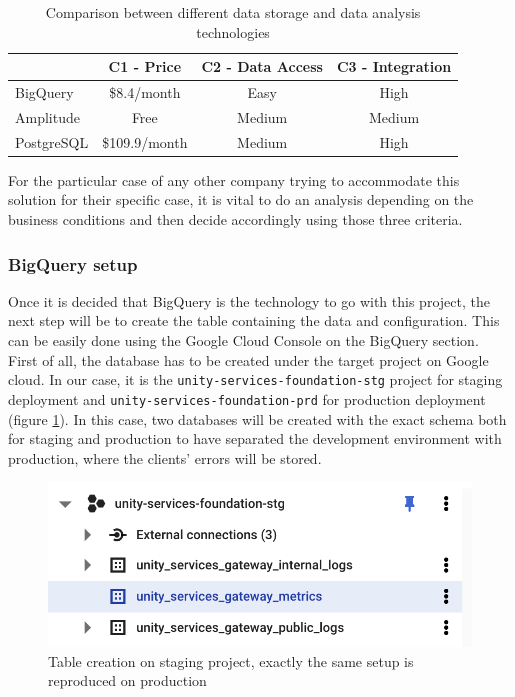 \documentclass[english, 12pt, a4paper, sci, utf8, a-1b, online]{aaltothesis}
\begin{document}
\begin{table}[h!]
\centering
\begin{tabular}{|l|c|c|c|}
\hline
           & C1 - Price    & C2 - Data Access & C3 - Integration \\ \hline\hline
BigQuery   & \$8.4/month   & Easy             & High             \\
Amplitude  & Free          & Medium           & Medium           \\
PostgreSQL & \$109.9/month & Medium           & High             \\ \hline 
\end{tabular}
\caption{Comparison between different data storage and data analysis technologies}
\label{tab:data-souces}
\end{table}

For the particular case of any other company trying to accommodate this solution for their specific case, it is vital to do an analysis depending on the business conditions and then decide accordingly using those three criteria.

\subsubsection{BigQuery setup}

Once it is decided that BigQuery is the technology to go with this project, the next step will be to create the table containing the data and configuration. This can be easily done using the Google Cloud Console on the BigQuery section.\\

First of all, the database has to be created under the target project on Google cloud. In our case, it is the \texttt{unity-services-foundation-stg} project for staging deployment and \texttt{unity-services-foundation-prd} for production deployment (figure \ref{fig:bigquery-creation}). In this case, two databases will be created with the exact schema both for staging and production to have separated the development environment with production, where the clients' errors will be stored.

\begin{figure}[h!]
    \centering
    \includegraphics[scale=0.3]{src/thesis/img/technical-solution/table-creation.png}
    \caption{Table creation on staging project, exactly the same setup is reproduced on production}
    \label{fig:bigquery-creation}
\end{figure}
\end{document}
